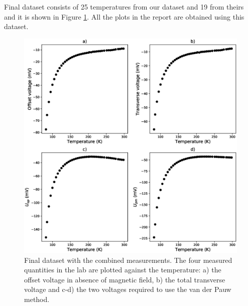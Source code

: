\documentclass[11pt,a4paper]{article}
\begin{document}
\begin{appendices}
Final dataset consists of 25 temperatures from our dataset and 19 from theirs and it is shown in Figure \ref{fig:final_dataset}. All the plots in the report are obtained using this dataset.

\begin{figure}[ht]
\centering
\includegraphics[width=\textwidth]{final_dataset.eps}
\caption{Final dataset with the combined measurements. The four measured quantities in the lab are plotted against the temperature: a) the offset voltage in absence of magnetic field, b) the total transverse voltage and c-d) the two voltages required to use the van der Pauw method.}
\label{fig:final_dataset}
\end{figure}

\end{appendices}
\end{document}
